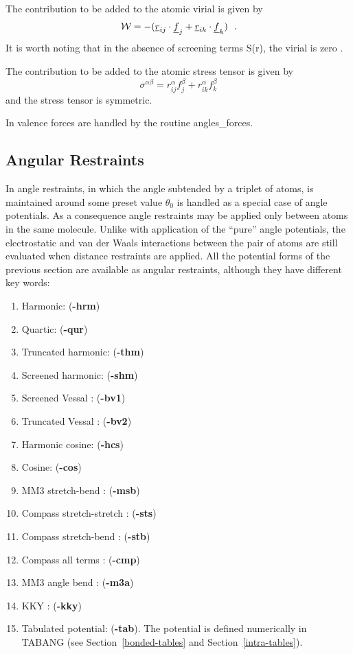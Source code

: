 The contribution to be added to the atomic virial is given by
\begin{equation}
{\cal W} = -(\mbox{$\underline{r}$}_{ij} \cdot \mbox{$\underline{f}$}_{j} + \mbox{$\underline{r}$}_{ik} \cdot
\mbox{$\underline{f}$}_{k})~~.
\end{equation}
It is worth noting that in the absence of screening terms S(r), the
virial is zero \cite{smith-93c}.

The contribution to be added to the atomic stress tensor is given by
\begin{equation}
\sigma^{\alpha \beta} = r_{ij}^{\alpha} f_{j}^{\beta} + r_{ik}^{\alpha} f_{k}^{\beta}
\end{equation}
and the stress tensor is symmetric.

In \D valence forces are handled by the routine {\sc
angles\_forces}.

\subsection{Angular Restraints}

In \D angle restraints, in which the angle subtended by a triplet
of atoms, is maintained around some preset value $\theta_{0}$ is
handled as a special case of angle potentials.  As a consequence
angle restraints may be applied only between atoms in the same
molecule.  Unlike with application of the ``pure'' angle
potentials, the electrostatic and
van der Waals interactions between
the pair of atoms are still evaluated when distance restraints are
applied.  All the potential forms of the previous section are
available as angular restraints, although they have different key
words:

\begin{enumerate}
\item Harmonic:  ({\bf -hrm})
\item Quartic:  ({\bf -qur})
\item Truncated harmonic:  ({\bf -thm})
\item Screened harmonic:  ({\bf -shm})
\item Screened Vessal \cite{vessal-94a}:  ({\bf -bv1})
\item Truncated Vessal \cite{smith-95a}:  ({\bf -bv2})
\item Harmonic cosine:  ({\bf -hcs})
\item Cosine:  ({\bf -cos})
\item MM3 stretch-bend \cite{allinger-89a}:  ({\bf -msb})
\item Compass stretch-stretch \cite{sun-98a}:  ({\bf -sts})
\item Compass stretch-bend \cite{sun-98a}:  ({\bf -stb})
\item Compass all terms \cite{sun-98a}:  ({\bf -cmp})
\item MM3 angle bend \cite{allinger-89a}:  ({\bf -m3a})
\item KKY \cite{kumagai-94a}:  ({\bf -kky})
\item Tabulated potential:  ({\bf -tab}).  The potential is defined numerically in TABANG (see Section~\ref{bonded-tables} and Section~\ref{intra-tables}).
\end{enumerate}

